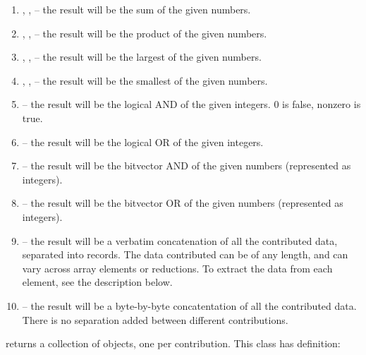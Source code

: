 \begin{enumerate}

\item {}, , -- the
result will be the sum of the given numbers.

\item {}, ,
-- the result will be the product of the given numbers.

\item {}, , -- the
result will be the largest of the given numbers.

\item {}, , -- the
result will be the smallest of the given numbers.

\item {}-- the result will be the logical AND of the given
integers.  0 is false, nonzero is true.

\item {}-- the result will be the logical OR of the given
integers.

\item {}-- the result will be the bitvector AND of the given numbers (represented as integers).

\item {}-- the result will be the bitvector OR of the given numbers (represented as integers).

\item {}-- the result will be a verbatim concatenation of
all the contributed data, separated into  records.
The data contributed can be of any length, and can vary across array elements
or reductions.  To extract the data from each element, see the description
below.

\item {}-- the result will be a byte-by-byte
concatentation of all the contributed data.  There is no separation
added between different contributions.

\end{enumerate}


 returns a collection of 
objects, one per contribution.  This class has definition:


